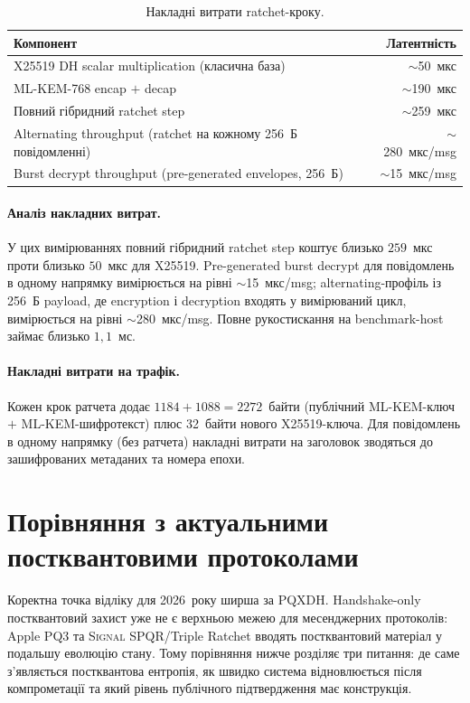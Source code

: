 \documentclass[11pt,a4paper]{article}
\theoremstyle{definition}
\newcommand{\Signal}{\mbox{\normalfont\scshape Signal}}
\newcommand{\PQXDH}{\textsf{PQXDH}}
\newcommand{\SPQR}{\textsf{SPQR}}
\newcommand{\PQThree}{\textsf{PQ3}}
\begin{document}
\begin{table}[H]
\centering
\caption{Накладні витрати ratchet-кроку.}\label{tab:bench-overhead}
\small
\begin{tabular}{@{}lr@{}}
\toprule
Компонент & Латентність \\
\midrule
X25519 DH scalar multiplication (класична база) & $\sim$50~мкс \\
ML-KEM-768 encap $+$ decap & $\sim$190~мкс \\
Повний гібридний ratchet step & $\sim$259~мкс \\
\midrule
Alternating throughput (ratchet на кожному 256~Б повідомленні) & $\sim$280~мкс/msg \\
Burst decrypt throughput (pre-generated envelopes, 256~Б) & $\sim$15~мкс/msg \\
\bottomrule
\end{tabular}
\end{table}

\paragraph{Аналіз накладних витрат.}
У цих вимірюваннях повний гібридний ratchet step коштує близько
$259$~мкс проти близько $50$~мкс для X25519. Pre-generated burst decrypt
для повідомлень в одному напрямку вимірюється на рівні
$\sim$15~мкс/msg; alternating-профіль із 256~Б payload, де encryption і
decryption входять у вимірюваний цикл, вимірюється на рівні
$\sim$280~мкс/msg. Повне рукостискання на benchmark-host займає близько
$1{,}1$~мс.

\paragraph{Накладні витрати на трафік.}
Кожен крок ратчета додає $1184 + 1088 = 2272$~байти (публічний
ML-KEM-ключ $+$ ML-KEM-шифротекст) плюс 32~байти нового X25519-ключа.
Для повідомлень в одному напрямку (без ратчета) накладні витрати на
заголовок зводяться до зашифрованих метаданих та номера епохи.

\section{Порівняння з актуальними постквантовими протоколами}\label{sec:comparison}

Коректна точка відліку для 2026~року ширша за \PQXDH{}.
Handshake-only постквантовий захист уже не є верхньою межею для
месенджерних протоколів: Apple \PQThree{} та \Signal{} \SPQR{}/Triple
Ratchet вводять постквантовий матеріал у подальшу еволюцію стану.
Тому порівняння нижче розділяє три питання: де саме з'являється
постквантова ентропія, як швидко система відновлюється після
компрометації та який рівень публічного підтвердження має конструкція.
\end{document}
